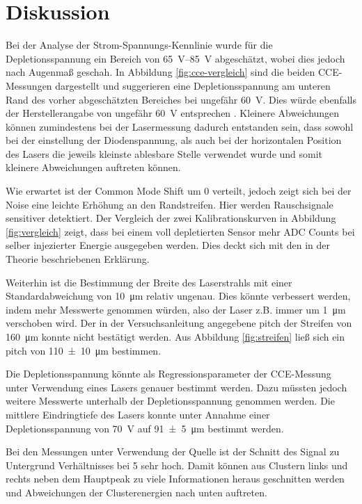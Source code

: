 \section{Diskussion}
\label{sec:Diskussion}

Bei der Analyse der Strom-Spannungs-Kennlinie wurde für die Depletionsspannung ein
Bereich von \SIrange{65}{85}{\volt} abgeschätzt, wobei dies jedoch nach Augenmaß
geschah. In Abbildung \ref{fig:cce-vergleich} sind die beiden CCE-Messungen dargestellt
und suggerieren eine Depletionsspannung am unteren Rand des vorher abgeschätzten Bereiches
bei ungefähr \SI{60}{\volt}.
Dies würde ebenfalls der Herstellerangabe von ungefähr \SI{60}{\volt} entsprechen \cite{alibava}.
Kleinere Abweichungen können zumindestens bei der Lasermessung dadurch entstanden sein,
dass sowohl bei der einstellung der Diodenspannung, als auch bei der horizontalen
Position des Lasers die jeweils kleinste ablesbare Stelle verwendet wurde und somit
kleinere Abweichungen auftreten können.

Wie erwartet ist der Common Mode Shift um \num{0} verteilt, jedoch zeigt sich bei
der Noise eine leichte Erhöhung an den Randstreifen. Hier werden Rauschsignale
sensitiver detektiert.
Der Vergleich der zwei Kalibrationskurven in Abbildung \ref{fig:vergleich} zeigt,
dass bei einem voll depletierten Sensor mehr ADC Counts bei selber injezierter
Energie ausgegeben werden. Dies deckt sich mit den in der Theorie beschriebenen
Erklärung.

Weiterhin ist die Bestimmung der Breite des Laserstrahls mit einer Standardabweichung
von \SI{10}{\micro\meter} relativ ungenau. Dies könnte verbessert werden, indem
mehr Messwerte genommen würden, also der Laser z.B. immer um \SI{1}{\micro\meter}
verschoben wird.
Der in der Versuchsanleitung angegebene pitch der Streifen von \SI{160}{\micro\meter}
\cite[13]{anleitung} konnte nicht bestätigt werden. Aus Abbildung \ref{fig:streifen}
ließ sich ein pitch von \SI{110(10)}{\micro\meter} bestimmen.

Die Depletionsspannung könnte als Regressionsparameter der CCE-Messung unter Verwendung
eines Lasers genauer bestimmt werden. Dazu müssten jedoch weitere Messwerte
unterhalb der Depletionsspannung genommen werden.
Die mittlere Eindringtiefe des Lasers konnte unter Annahme einer Depletionsspannung
von \SI{70}{\volt} auf \SI{91(5)}{\micro\meter} bestimmt werden.

Bei den Messungen unter Verwendung der Quelle ist der Schnitt des Signal zu Untergrund
Verhältnisses bei \num{5} sehr hoch. Damit können aus Clustern links und rechts neben dem
Hauptpeak zu viele Informationen heraus geschnitten werden und Abweichungen der
Clusterenergien nach unten auftreten.
